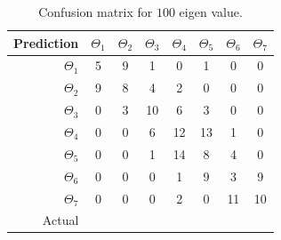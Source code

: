 \documentclass[runningheads,a4paper]{llncs}
\begin{document}
\begin{table}
\centering
\caption{Confusion matrix for $100$ eigen value.}
\label{tab:conf100}
\begin{tabular}{@{}r|ccccccc@{}}
\toprule
Prediction & \multicolumn{1}{r}{$\Theta_1$} & \multicolumn{1}{r}{$\Theta_2$} & \multicolumn{1}{r}{$\Theta_3$} & \multicolumn{1}{r}{$\Theta_4$} & \multicolumn{1}{r}{$\Theta_5$} & \multicolumn{1}{r}{$\Theta_6$} & \multicolumn{1}{r}{$\Theta_7$} \\ \midrule
$\Theta_1$ & 5                              & 9                              & 1                              & 0                              & 1                              & 0                              & 0                              \\
$\Theta_2$ & 9                              & 8                              & 4                              & 2                              & 0                              & 0                              & 0                              \\
$\Theta_3$ & 0                              & 3                              & 10                             & 6                              & 3                              & 0                              & 0                              \\
$\Theta_4$ & 0                              & 0                              & 6                              & 12                             & 13                             & 1                              & 0                              \\
$\Theta_5$ & 0                              & 0                              & 1                              & 14                             & 8                              & 4                              & 0                              \\
$\Theta_6$ & 0                              & 0                              & 0                              & 1                              & 9                              & 3                              & 9                              \\
$\Theta_7$ & 0                              & 0                              & 0                              & 2                              & 0                              & 11                             & 10                             \\ \midrule
Actual     & \multicolumn{1}{l}{}           & \multicolumn{1}{l}{}           & \multicolumn{1}{l}{}           & \multicolumn{1}{l}{}           & \multicolumn{1}{l}{}           & \multicolumn{1}{l}{}           & \multicolumn{1}{l}{}           \\ \cmidrule(r){1-1}
\end{tabular}
\end{table}
\end{document}
